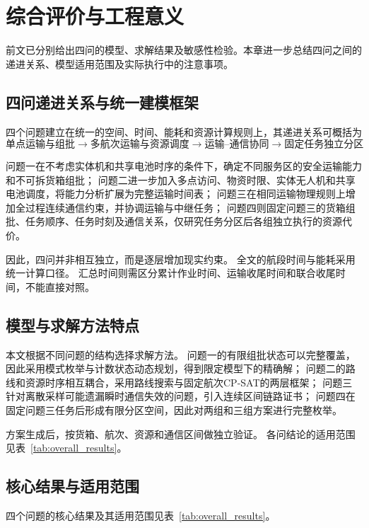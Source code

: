 \section{综合评价与工程意义}

前文已分别给出四问的模型、求解结果及敏感性检验。本章进一步总结四问之间的递进关系、模型适用范围及实际执行中的注意事项。

\subsection{四问递进关系与统一建模框架}

四个问题建立在统一的空间、时间、能耗和资源计算规则上，其递进关系可概括为
\[
\text{单点运输与组批}
\rightarrow
\text{多航次运输与资源调度}
\rightarrow
\text{运输--通信协同}
\rightarrow
\text{固定任务独立分区}
\]

问题一在不考虑实体机和共享电池时序的条件下，确定不同服务区的安全运输能力和不可拆货箱组批；
问题二进一步加入多点访问、物资时限、实体无人机和共享电池调度，将能力分析扩展为完整运输时间表；
问题三在相同运输物理规则上增加全过程连续通信约束，并协调运输与中继任务；
问题四则固定问题三的货箱组批、任务顺序、任务时刻及通信关系，仅研究任务分区后各组独立执行的资源代价。

因此，四问并非相互独立，而是逐层增加现实约束。
全文的航段时间与能耗采用统一计算口径。
汇总时间则需区分累计作业时间、运输收尾时间和联合收尾时间，不能直接对照。

\subsection{模型与求解方法特点}

本文根据不同问题的结构选择求解方法。
问题一的有限组批状态可以完整覆盖，因此采用模式枚举与计数状态动态规划，得到限定模型下的精确解；
问题二的路线和资源时序相互耦合，采用路线搜索与固定航次CP-SAT的两层框架；
问题三针对离散采样可能遗漏瞬时通信失效的问题，引入连续区间链路证书；
问题四在固定问题三任务后形成有限分区空间，因此对两组和三组方案进行完整枚举。

方案生成后，按货箱、航次、资源和通信区间做独立验证。
各问结论的适用范围见表~\ref{tab:overall_results}。

\subsection{核心结果与适用范围}

四个问题的核心结果及其适用范围见表~\ref{tab:overall_results}。


